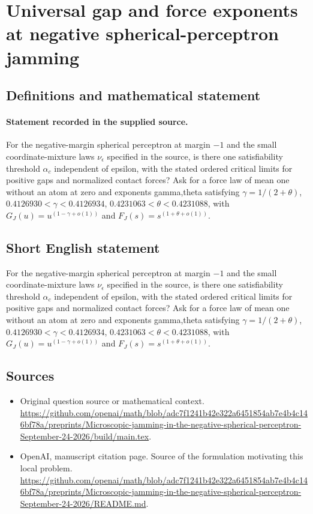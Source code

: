\documentclass[11pt]{article}
\begin{document}
\section*{Universal gap and force exponents at negative spherical-perceptron jamming}\label{statement}
\subsection{Definitions and mathematical statement}
\paragraph{Statement recorded in the supplied source.}
For the negative-margin spherical perceptron at margin $-1$ and the small coordinate-mixture laws $\nu _\epsilon $ specified in the source, is there one satisfiability threshold $\alpha _c$ independent of epsilon, with the stated ordered critical limits for positive gaps and normalized contact forces? Ask for a force law of mean one without an atom at zero and exponents gamma,theta satisfying $\gamma =1/(2+\theta )$, $0.4126930<\gamma <0.4126934$, $0.4231063<\theta <0.4231088$, with $G_J(u)=u^(1-\gamma +o(1))$ and $F_J(s)=s^(1+\theta +o(1))$.
\subsection{Short English statement}
For the negative-margin spherical perceptron at margin $-1$ and the small coordinate-mixture laws $\nu _\epsilon $ specified in the source, is there one satisfiability threshold $\alpha _c$ independent of epsilon, with the stated ordered critical limits for positive gaps and normalized contact forces? Ask for a force law of mean one without an atom at zero and exponents gamma,theta satisfying $\gamma =1/(2+\theta )$, $0.4126930<\gamma <0.4126934$, $0.4231063<\theta <0.4231088$, with $G_J(u)=u^(1-\gamma +o(1))$ and $F_J(s)=s^(1+\theta +o(1))$.
\subsection{Sources}
\begin{itemize}
\item[S1] Original question source or mathematical context.
\url{https://github.com/openai/math/blob/adc7f1241b42e322a6451854ab7e4b4c146bf78a/preprints/Microscopic-jamming-in-the-negative-spherical-perceptron-September-24-2026/build/main.tex}.
\item[S2] OpenAI, manuscript citation page. Source of the formulation motivating this local problem.
\url{https://github.com/openai/math/blob/adc7f1241b42e322a6451854ab7e4b4c146bf78a/preprints/Microscopic-jamming-in-the-negative-spherical-perceptron-September-24-2026/README.md}.
\end{itemize}
\end{document}
